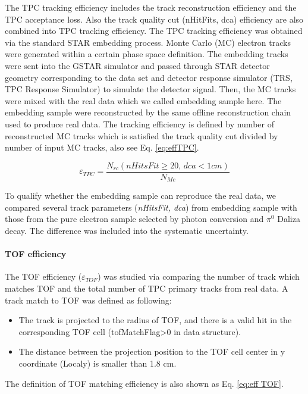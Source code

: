 The TPC tracking efficiency includes the track reconstruction efficiency
and the TPC acceptance loss. Also the track quality cut (nHitFits,
dca) efficiency are also combined into TPC tracking efficiency. The
TPC tracking efficiency was obtained via the standard STAR embedding
process. Monte Carlo (MC) electron tracks were generated within a
certain phase space definition. The embedding tracks were sent into
the GSTAR simulator and passed through STAR detector geometry corresponding
to the data set and detector response simulator (TRS, TPC Response
Simulator) to simulate the detector signal. Then, the MC tracks were
mixed with the real data which we called embedding sample here. The
embedding sample were reconstructed by the same offline reconstruction
chain used to produce real data. The tracking efficiency is defined
by number of reconstructed MC tracks which is satisfied the track
quality cut divided by number of input MC tracks, also see Eq. \ref{eq:effTPC}.

\begin{equation}
\varepsilon_{TPC}=\frac{N_{rc}(nHitsFit\geqslant20,\, dca<1cm)}{N_{Mc}}\label{eq:effTPC}
\end{equation}


To qualify whether the embedding sample can reproduce the real data,
we compared several track parameters (\emph{nHitsFit, dca}) from embedding
sample with those from the pure electron sample selected by photon
conversion and $\pi^{0}$ Daliza decay. The difference was included
into the systematic uncertainty.


\paragraph{TOF efficiency}

The TOF efficiency ($\varepsilon_{TOF}$) was studied via comparing
the number of track which matches TOF and the total number of TPC
primary tracks from real data. A track match to TOF was defined as
following:
\begin{itemize}
\item The track is projected to the radius of TOF, and there is a valid
hit in the corresponding TOF cell (tofMatchFlag>0 in data structure).
\item The distance between the projection position to the TOF cell center
in y coordinate (Localy) is smaller than 1.8 cm.
\end{itemize}
The definition of TOF matching efficiency is also shown as Eq. \ref{eq:eff TOF}.

